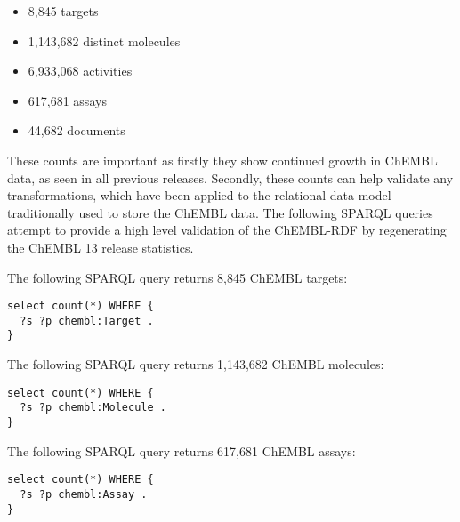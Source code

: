 \documentclass[sw]{iosart2c}
\begin{document}
\begin{itemize}
  \item 8,845 targets
  \item 1,143,682 distinct molecules
  \item 6,933,068 activities
  \item 617,681 assays
  \item 44,682 documents
\end{itemize}

These counts are important as firstly they show continued growth in ChEMBL data, as seen 
in all previous releases. Secondly, these counts can help validate any transformations, 
which have been applied to the relational data model traditionally used to store the ChEMBL 
data. The following SPARQL queries attempt to provide a high level validation of the 
ChEMBL-RDF by regenerating the ChEMBL 13 release statistics.

The following SPARQL query returns 8,845 ChEMBL targets:
     
\begin{tiny}
\begin{verbatim}
select count(*) WHERE {
  ?s ?p chembl:Target .
}
\end{verbatim}
\end{tiny}

The following SPARQL query returns 1,143,682 ChEMBL molecules:


\begin{tiny}
\begin{verbatim}
select count(*) WHERE {
  ?s ?p chembl:Molecule .
}
\end{verbatim}
\end{tiny}

The following SPARQL query returns 617,681 ChEMBL assays:

\begin{tiny}
\begin{verbatim}
select count(*) WHERE {
  ?s ?p chembl:Assay .
}
\end{verbatim}
\end{tiny}
\end{document}
